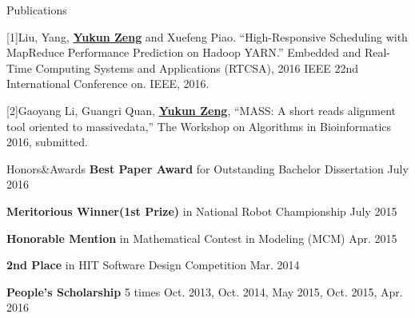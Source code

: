 \documentclass{resume} %
\newcommand{\tab}[1]{\hspace{.2667\textwidth}\rlap{#1}}
\newcommand{\itab}[1]{\hspace{0em}\rlap{#1}}
\begin{document}

\begin{rSection}{Publications}

{[1]Liu, Yang, }\underline{\bf Yukun Zeng}{ and Xuefeng Piao. ``High-Responsive Scheduling with MapReduce Performance Prediction on Hadoop YARN.'' Embedded and Real-Time Computing Systems and Applications (RTCSA), 2016 IEEE 22nd International Conference on. IEEE, 2016.
}
\vspace*{-0.2em}

{[2]Gaoyang Li, Guangri Quan, }\underline{\bf Yukun Zeng}{, ``MASS: A short reads alignment tool oriented to massive}{data,'' The Workshop on Algorithms in Bioinformatics 2016, submitted.}

\end{rSection}


\begin{rSection}{Honors\&Awards}
{\bf Best Paper Award}{ for Outstanding Bachelor Dissertation} \hfill {July 2016}
\vspace*{-0.4em}

{\bf Meritorious Winner(1st Prize)}{ in National Robot Championship} \hfill {July 2015}
\vspace*{-0.4em}

{\bf Honorable Mention}{ in Mathematical Contest in Modeling (MCM)} \hfill {Apr. 2015}
\vspace*{-0.4em}

{\bf 2nd Place}{ in HIT Software Design Competition} \hfill {Mar. 2014} 
\vspace*{-0.4em}

{\bf People's Scholarship} 5 times \hfill {Oct. 2013, Oct. 2014, May 2015, Oct. 2015, Apr. 2016}
\vspace*{-0.4em}

\end{rSection}
\end{document}

